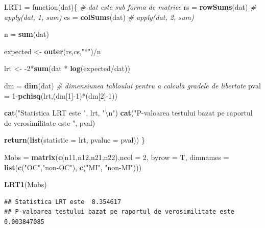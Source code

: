 \documentclass[]{article}
\newenvironment{Shaded}{\begin{snugshade}}{\end{snugshade}}
\newcommand{\KeywordTok}[1]{\textcolor[rgb]{0.13,0.29,0.53}{\textbf{{#1}}}}
\newcommand{\DataTypeTok}[1]{\textcolor[rgb]{0.13,0.29,0.53}{{#1}}}
\newcommand{\DecValTok}[1]{\textcolor[rgb]{0.00,0.00,0.81}{{#1}}}
\newcommand{\CharTok}[1]{\textcolor[rgb]{0.31,0.60,0.02}{{#1}}}
\newcommand{\StringTok}[1]{\textcolor[rgb]{0.31,0.60,0.02}{{#1}}}
\newcommand{\CommentTok}[1]{\textcolor[rgb]{0.56,0.35,0.01}{\textit{{#1}}}}
\newcommand{\NormalTok}[1]{{#1}}
\begin{document}
\begin{Shaded}
\begin{Highlighting}[]
\NormalTok{LRT1 =}\StringTok{ }\NormalTok{function(dat)\{}
  \CommentTok{# dat este sub forma de matrice }
  \NormalTok{rs =}\StringTok{ }\KeywordTok{rowSums}\NormalTok{(dat) }\CommentTok{# apply(dat, 1, sum)}
  \NormalTok{cs =}\StringTok{ }\KeywordTok{colSums}\NormalTok{(dat) }\CommentTok{# apply(dat, 2, sum)}
  
  \NormalTok{n =}\StringTok{ }\KeywordTok{sum}\NormalTok{(dat)}
  
  \NormalTok{expected <-}\StringTok{ }\KeywordTok{outer}\NormalTok{(rs,cs,}\StringTok{"*"}\NormalTok{)/n}
  
  \NormalTok{lrt <-}\StringTok{ }\NormalTok{-}\DecValTok{2}\NormalTok{*}\KeywordTok{sum}\NormalTok{(dat *}\StringTok{ }\KeywordTok{log}\NormalTok{(expected/dat)) }
  
  \NormalTok{dm =}\StringTok{ }\KeywordTok{dim}\NormalTok{(dat) }\CommentTok{# dimensiunea tabloului pentru a calcula gradele de libertate}
  \NormalTok{pval =}\StringTok{ }\DecValTok{1}\NormalTok{-}\KeywordTok{pchisq}\NormalTok{(lrt,(dm[}\DecValTok{1}\NormalTok{]-}\DecValTok{1}\NormalTok{)*(dm[}\DecValTok{2}\NormalTok{]-}\DecValTok{1}\NormalTok{))}
  
  \KeywordTok{cat}\NormalTok{(}\StringTok{"Statistica LRT este "}\NormalTok{, lrt, }\StringTok{"}\CharTok{\textbackslash{}n}\StringTok{"}\NormalTok{)}
  \KeywordTok{cat}\NormalTok{(}\StringTok{"P-valoarea testului bazat pe raportul de verosimilitate este "}\NormalTok{, pval)}
  
  \KeywordTok{return}\NormalTok{(}\KeywordTok{list}\NormalTok{(}\DataTypeTok{statistic =} \NormalTok{lrt, }\DataTypeTok{pvalue =} \NormalTok{pval))}
\NormalTok{\}}

\NormalTok{Mobs =}\StringTok{ }\KeywordTok{matrix}\NormalTok{(}\KeywordTok{c}\NormalTok{(n11,n12,n21,n22),}\DataTypeTok{ncol =} \DecValTok{2}\NormalTok{, }\DataTypeTok{byrow =} \NormalTok{T, }
              \DataTypeTok{dimnames =} \KeywordTok{list}\NormalTok{(}\KeywordTok{c}\NormalTok{(}\StringTok{"OC"}\NormalTok{,}\StringTok{"non-OC"}\NormalTok{), }\KeywordTok{c}\NormalTok{(}\StringTok{"MI"}\NormalTok{, }\StringTok{"non-MI"}\NormalTok{)))}

\KeywordTok{LRT1}\NormalTok{(Mobs) }
\end{Highlighting}
\end{Shaded}

\begin{verbatim}
## Statistica LRT este  8.354617 
## P-valoarea testului bazat pe raportul de verosimilitate este  0.003847085
\end{verbatim}
\end{document}
